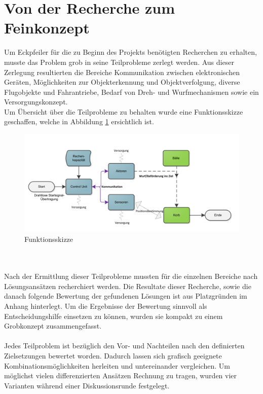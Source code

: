 \section{Von der Recherche zum Feinkonzept}
Um Eckpfeiler für die zu Beginn des Projekts benötigten Recherchen zu erhalten, musste das Problem grob in seine Teilprobleme zerlegt werden. Aus dieser Zerlegung resultierten die Bereiche Kommunikation zwischen elektronischen Geräten, Möglichkeiten zur Objekterkennung und Objektverfolgung, diverse Flugobjekte und Fahrantriebe, Bedarf von Dreh- und Wurfmechanismen sowie ein Versorgungskonzept. \\
Um Übersicht über die Teilprobleme zu behalten wurde eine Funktionsskizze geschaffen, welche in  Abbildung \ref{fig:Funktionsskizze} ersichtlich ist.\\
\begin{figure}[h!]
	\centering
	\includegraphics[width=1\textwidth]{Enddokumentation/Varianten/Bilder/Funktionsskizze.png}
	\caption{Funktionsskizze}
	\label{fig:Funktionsskizze}
\end{figure}
\\\\
Nach der Ermittlung dieser Teilprobleme mussten für die einzelnen Bereiche nach Lösungsansätzen recherchiert werden. Die Resultate dieser Recherche, sowie die danach folgende Bewertung der gefundenen Lösungen ist aus Platzgründen im Anhang hinterlegt. Um die Ergebnisse der Bewertung sinnvoll als Entscheidungshilfe einsetzen zu können, wurden sie kompakt zu einem Grobkonzept zusammengefasst.\\
\\
Jedes Teilproblem ist bezüglich den Vor- und Nachteilen nach den definierten Zielsetzungen bewertet worden. Dadurch lassen sich grafisch geeignete Kombinationsmöglichkeiten herleiten und untereinander vergleichen. Um möglichst vielen differenzierten Ansätzen Rechnung zu tragen, wurden vier Varianten während einer Diskussionsrunde festgelegt.\\
